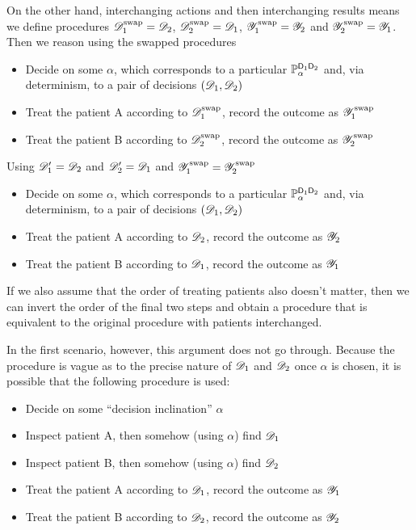 On the other hand, interchanging actions and then interchanging results means we define procedures $\mathscr{D}_1^{\text{swap}}=\mathscr{D}_2$, $\mathscr{D}_2^{\text{swap}}=\mathscr{D}_1$, $\mathscr{Y}_1^{\text{swap}}=\mathscr{Y}_2$ and $\mathscr{Y}_2^{\text{swap}}=\mathscr{Y}_1$. Then we reason using the swapped procedures

\begin{itemize}
    \item Decide on some $\alpha$, which corresponds to a particular $\mathbb{P}_\alpha^{\mathsf{D}_1\mathsf{D}_2}$ and, via determinism, to a pair of decisions $(\mathscr{D}_1,\mathscr{D}_2)$
     \item Treat the patient A according to $\mathscr{D}^{\text{swap}}_1$, record the outcome as $\mathscr{Y}_1^{\text{swap}}$
    \item Treat the patient B according to $\mathscr{D}^{\text{swap}}_2$, record the outcome as $\mathscr{Y}_2^{\text{swap}}$
\end{itemize}

Using $\mathscr{D}_1'=\mathscr{D}_2$ and $\mathscr{D}_2'=\mathscr{D}_1$ and $\mathscr{Y}_1^{\text{swap}}=\mathscr{Y}_2^{\text{swap}}$

\begin{itemize}
    \item Decide on some $\alpha$, which corresponds to a particular $\mathbb{P}_\alpha^{\mathsf{D}_1\mathsf{D}_2}$ and, via determinism, to a pair of decisions $(\mathscr{D}_1,\mathscr{D}_2)$
    \item Treat the patient A according to $\mathscr{D}_2$, record the outcome as $\mathscr{Y}_2$
    \item Treat the patient B according to $\mathscr{D}_1$, record the outcome as $\mathscr{Y}_1$
\end{itemize}

If we also assume that the order of treating patients also doesn't matter, then we can invert the order of the final two steps and obtain a procedure that is equivalent to the original procedure with patients interchanged.

In the first scenario, however, this argument does not go through. Because the procedure is vague as to the precise nature of $\mathscr{D}_1$ and $\mathscr{D}_2$ once $\alpha$ is chosen, it is possible that the following procedure is used:

\begin{itemize}
    \item Decide on some ``decision inclination'' $\alpha$
    \item Inspect patient A, then somehow (using $\alpha$) find $\mathscr{D}_1$
    \item Inspect patient B, then somehow (using $\alpha$) find $\mathscr{D}_2$
    \item Treat the patient A according to $\mathscr{D}_1$, record the outcome as $\mathscr{Y}_1$
    \item Treat the patient B according to $\mathscr{D}_2$, record the outcome as $\mathscr{Y}_2$
\end{itemize}


